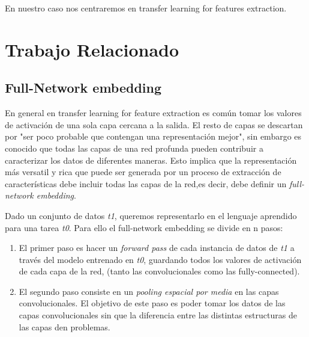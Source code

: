 \documentclass[12,twoside]{TFG-GM}
\theoremstyle{definition}
\theoremstyle{remark}
\begin{document}
En nuestro caso nos centraremos en transfer learning for features extraction. 




\newpage

\section{Trabajo Relacionado}

\subsection{Full-Network embedding}




En general en transfer learning for feature extraction es común tomar los valores de activación de una sola capa cercana a la salida. El resto de capas se descartan por 
"ser poco probable que contengan una representación mejor", sin embargo es conocido que todas las capas de una red profunda pueden contribuir a caracterizar los datos de diferentes maneras. Esto implica que la representación más versatil y rica que puede ser generada por un proceso de extracción de características debe incluir todas las capas de la red,es decir, debe definir un \textit{full-network embedding}. 

Dado un conjunto de datos \textit{t1}, queremos representarlo en el lenguaje aprendido para una tarea \textit{t0}. Para ello el full-network embedding se divide en n pasos: 
\begin{enumerate}
\item El primer paso es hacer un \textit{forward pass} de cada instancia de datos de \textit{t1} a través del modelo entrenado en \textit{t0}, guardando todos los valores de activación de cada capa de la red, (tanto las convolucionales como las fully-connected). 
\item El segundo paso consiste en un \textit{pooling espacial por media} en las capas convolucionales. El objetivo de este paso es poder tomar los datos de las capas convolucionales sin que la diferencia entre las distintas estructuras de las capas den problemas.
\end{enumerate}
\end{document}
